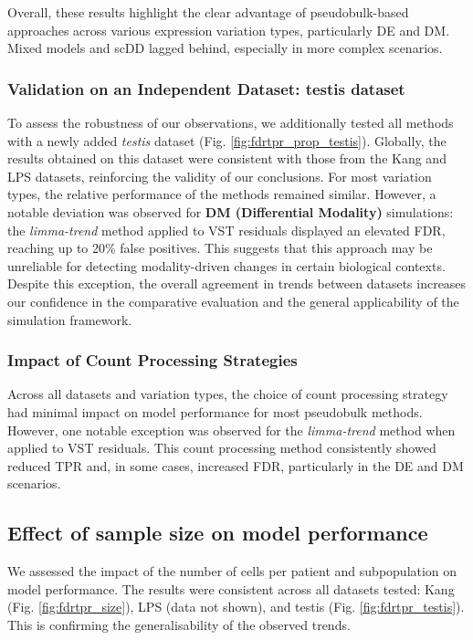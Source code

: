 \documentclass[a4paper, 11pt, twocolumn]{article}
\begin{document}
\begin{multicols}{2}
Overall, these results highlight the clear advantage of pseudobulk-based approaches across various expression variation types, particularly DE and DM. Mixed models and scDD lagged behind, especially in more complex scenarios.
\subsubsection{Validation on an Independent Dataset: testis dataset} 
To assess the robustness of our observations, we additionally tested all methods with a newly added \textit{testis} dataset (Fig. \ref{fig:fdrtpr_prop_testis}). Globally, the results obtained on this dataset were consistent with those from the Kang and LPS datasets, reinforcing the validity of our conclusions. For most variation types, the relative performance of the methods remained similar. However, a notable deviation was observed for \textbf{DM (Differential Modality)} simulations: the \textit{limma-trend} method applied to VST residuals displayed an elevated FDR, reaching up to 20\% false positives. This suggests that this approach may be unreliable for detecting modality-driven changes in certain biological contexts. Despite this exception, the overall agreement in trends between datasets increases our confidence in the comparative evaluation and the general applicability of the simulation framework.

\subsubsection{Impact of Count Processing Strategies}
Across all datasets and variation types, the choice of count processing strategy had minimal impact on model performance for most pseudobulk methods. However, one notable exception was observed for the \textit{limma-trend} method when applied to VST residuals. This count processing method consistently showed reduced TPR and, in some cases, increased FDR, particularly in the DE and DM scenarios.

\subsection{Effect of sample size on model performance}

We assessed the impact of the number of cells per patient and subpopulation on model performance. The results were consistent across all datasets tested: Kang (Fig. \ref{fig:fdrtpr_size}), LPS (data not shown), and testis (Fig. \ref{fig:fdrtpr_testis}). This is confirming the generalisability of the observed trends.


\end{multicols}
\end{document}
